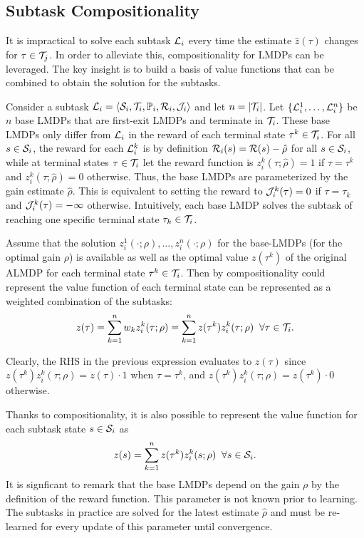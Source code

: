 \subsection{Subtask Compositionality}
It is impractical to solve each subtask $\mathcal{L}_i$ every time the estimate $\hat z(\tau)$ changes for $\tau\in\mathcal{T}_j$. In order to alleviate this, compositionality for LMDPs can be leveraged. The key insight is to build a basis of value functions that can be combined to obtain the solution for the subtasks.

Consider a subtask $\mathcal{L}_i=\langle\mathcal{S}_i,\mathcal{T}_i,\mathbb{P}_i,\mathcal{R}_i,\mathcal{J}_i\rangle$ and let $n=|\mathcal{T}_i|$.  Let $\{\mathcal{L}_i^1,\ldots,\mathcal{L}_i^n\}$ be $n$ base LMDPs that are first-exit LMDPs and terminate in $\mathcal{T}_i$. These base LMDPs only differ from $\mathcal{L}_i$ in the reward of each terminal state $\tau^k\in\mathcal{T}_i$. For all $s\in\mathcal{S}_i$, the reward for each $\mathcal{L}_i^k$ is by definition $\mathcal{R}_i(s)=\mathcal{R}(s)-\hat\rho$ for all $s\in\mathcal{S}_i$, while at terminal states $\tau\in\mathcal{T}_i$ let the reward function is $z_i^k(\tau;\hat\rho)=1$ if $\tau=\tau^k$ and $z_i^k(\tau;\hat\rho)=0$ otherwise. Thus, the base LMDPs are parameterized by the gain estimate $\hat\rho$. This is equivalent to setting the reward to $\mathcal{J}_i^k(\tau)=0$ if $\tau=\tau_k$ and $\mathcal{J}_i^k(\tau)=-\infty$ otherwise. Intuitively, each base LMDP solves the subtask of reaching one specific terminal state $\tau_k\in\mathcal{T}_i$.

Assume that the solution $z_i^1(\cdot;\rho),\ldots,z_i^n(\cdot;\rho)$ for the base-LMDPs (for the optimal gain $\rho$) is available as well as the optimal value $z(\tau^k)$ of the original ALMDP for each terminal state $\tau^k\in\mathcal{T}_i$. Then by compositionality could represent the value function of each terminal state can be represented as a weighted combination of the subtasks:
\begin{equation}
  z(\tau) = \sum_{k=1}^n w_k z_i^k(\tau;\rho) =  \sum_{k=1}^n z(\tau^k) z_i^k(\tau;\rho) \;\;\forall\tau\in\mathcal{T}_i.
  \label{eq:comp_terminal}
\end{equation}

Clearly, the RHS in the previous expression evaluates to $z(\tau)$ since $z(\tau^k) z_i^k(\tau;\rho) = z(\tau)\cdot 1$ when $\tau = \tau^k$, and
$z(\tau^k) z_i^k(\tau;\rho) = z(\tau^k)\cdot 0$ otherwise.

Thanks to compositionality, it is also possible to represent the value function for each subtask state $s\in\mathcal{S}_i$ as
\begin{equation}
  z(s) = \sum_{k=1}^n z(\tau^k) z_i^k(s;\rho)\;\;\forall s\in\mathcal{S}_i.
  \label{eq:comp_internal}
\end{equation}
It is signficant to remark that the base LMDPs depend on the gain $\rho$ by the definition of the reward function. This parameter is not known prior to learning. The subtasks in practice are solved for the latest estimate $\hat\rho$ and must be re-learned for every update of this parameter until convergence.
